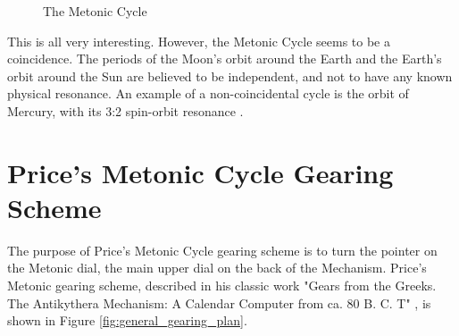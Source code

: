 \documentclass[11pt, oneside]{article}   	%
\theoremstyle{definition}
\begin{document}
\bigskip
\bigskip
\begin{figure}[H]
  \caption{The Metonic Cycle \cite{youtube:freeth2021}}
  \label{fig:metonic_cycle}
\end{figure}

\bigskip
\bigskip
\noindent
This is all very interesting. However, the Metonic Cycle seems to be a coincidence. The periods of the Moon's orbit around the Earth and the Earth's 
orbit around the Sun are believed to be independent, and not to have any known physical resonance. An example of a non-coincidental 
cycle is the orbit of Mercury, with its 3:2 spin-orbit resonance \cite{Correia2004}. 

\section{Price's Metonic Cycle Gearing Scheme}
The purpose of Price's  Metonic Cycle gearing scheme is to turn the pointer on the Metonic dial, the main upper dial on the back of the Mechanism. 
Price's Metonic gearing scheme, described in his classic work "Gears from the Greeks. The Antikythera Mechanism: A Calendar Computer from 
ca. 80 B. C. T" \cite{gears_from_the_greeks},  is shown in Figure \ref{fig:general_gearing_plan}. 
\end{document}
